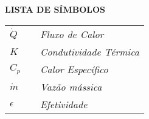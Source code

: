 \begin{center}
	\textbf {LISTA DE SÍMBOLOS}
\end{center}
\vspace{0.5cm}
\begin{flushleft}
	\begin{tabularx}{12cm}{X X l}
	
		$\dot{Q}$ &  &  \itshape Fluxo de Calor\\
		$K$ &  &  \itshape Condutividade Térmica\\
		$C_{p}$ &  &  \itshape Calor Específico\\
		$\dot{m}$ &  &  \itshape Vazão mássica\\
		$\epsilon$ &  &  \itshape Efetividade

	\end{tabularx}
\end{flushleft}
\thispagestyle{empty}